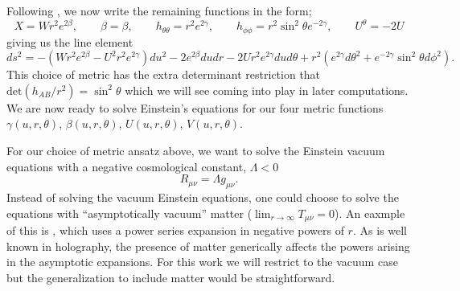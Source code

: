 \documentclass[a4paper,11pt]{article}
\numberwithin{equation}{section}
\begin{document}
Following \cite{Bondi:1962px}, we now write the remaining functions in the form;
\begin{equation}
X=Wr^{2}e^{2\beta}, \qquad \beta=\beta, \qquad h_{\theta \theta}=r^2e^{2\gamma}, \qquad h_{\phi \phi}=r^2\sin^2\theta e^{-2\gamma}, \qquad U^{\theta}=-2U
\end{equation}
giving us the line element 
\begin{equation}  \label{eq: Bondi_Metric}
ds^2=-(Wr^{2}e^{2\beta}-U^2r^2e^{2\gamma})du^2-2e^{2\beta}dudr-2Ur^2e^{2\gamma}dud\theta+r^2(e^{2\gamma}d\theta^2+e^{-2\gamma}\sin^2\theta d\phi^2).
\end{equation}
This choice of metric has the extra determinant restriction that $\text{det}(h_{AB}/r^2)=\sin^2\theta$ which we will see coming into play in later computations. We are now ready to solve Einstein's equations for our four metric functions $\gamma(u,r,\theta)$, $\beta(u, r, \theta)$, $U(u,r,\theta)$, $V(u,r,\theta)$. \par

For our choice of metric ansatz above, we want to solve the Einstein vacuum equations with a negative cosmological constant, $\Lambda<0$ 
\begin{equation} \label{eq:2.1}
R_{\mu \nu}=\Lambda g_{\mu \nu}. 
\end{equation}
Instead of solving the vacuum Einstein equations, one could choose to solve the equations with ``asymptotically vacuum'' matter ($\lim_{r \rightarrow \infty} T_{\mu \nu} =0$). An eaxmple of this is \cite{Flanagan:2015pxa}, which uses a power series expansion in negative powers of $r$. As is well known in holography, the presence of matter generically affects the powers arising in the asymptotic expansions. For this work we will restrict to the vacuum case but the generalization to include matter would be straightforward. 

\end{document}
